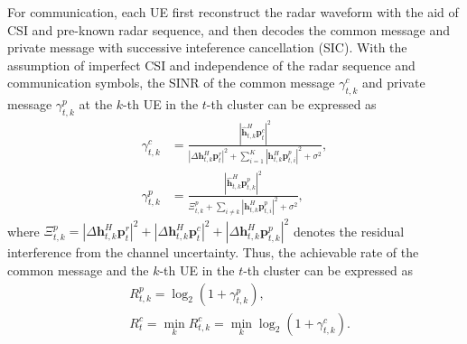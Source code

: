 \documentclass[twocolumn,journal]{IEEEtran}
\begin{document}
For communication, each UE first reconstruct the radar waveform with the aid of CSI and pre-known radar sequence, and then decodes the common message and private message with successive inteference cancellation (SIC). With the assumption of imperfect CSI and independence of the radar sequence and communication symbols, the SINR of the common message \(\gamma^{c}_{t,k}\) and private message \(\gamma^{p}_{t,k}\) at the \(k\)-th UE in the \(t\)-th cluster can be expressed as \cite{leeMaxMin2023}
\begin{subequations}
\begin{align}
    \gamma^{c}_{t,k} &= \frac{\left| \hat{\boldsymbol{h}}^{H}_{t,k}\boldsymbol{p}^{c}_{t} \right|^2}{\left| \Delta\boldsymbol{h}^{H}_{t,k}\boldsymbol{p}^{r}_{t}\right|^2 +  \sum_{i=1}^{K}\left| \boldsymbol{h}^{H}_{t,k}\boldsymbol{p}^{p}_{t,i}\right|^2 + \sigma^2},\\
    \gamma^{p}_{t,k} &= \frac{\left| \hat{\boldsymbol{h}}^{H}_{t,k}\boldsymbol{p}^{p}_{t,k} \right|^2}{\Xi^{p}_{t,k} +\sum_{i\neq k}\left| \boldsymbol{h}^{H}_{t,k}\boldsymbol{p}^{p}_{t,i}\right|^2 + \sigma^2},
\end{align}
\end{subequations}
where \(\Xi^{p}_{t,k}=\left| \Delta\boldsymbol{h}^{H}_{t,k}\boldsymbol{p}^{r}_{t}\right|^2 + \left| \Delta\boldsymbol{h}^{H}_{t,k}\boldsymbol{p}^{c}_{t}\right|^2 + \left| \Delta\boldsymbol{h}^{H}_{t,k}\boldsymbol{p}^{p}_{t,k}\right|^2\) denotes the residual interference from the channel uncertainty.
Thus, the achievable rate of the common message and the \(k\)-th UE in the \(t\)-th cluster can be expressed as
\begin{subequations}
\begin{align}
    &R^{p}_{t,k} = \log_2(1 + \gamma^{p}_{t,k}),\\
    &R^{c}_{t}   = \min_{k} R^{c}_{t,k}= \min_{k} \log_2(1 + \gamma^{c}_{t,k}).
\end{align}    
\end{subequations}
\end{document}
